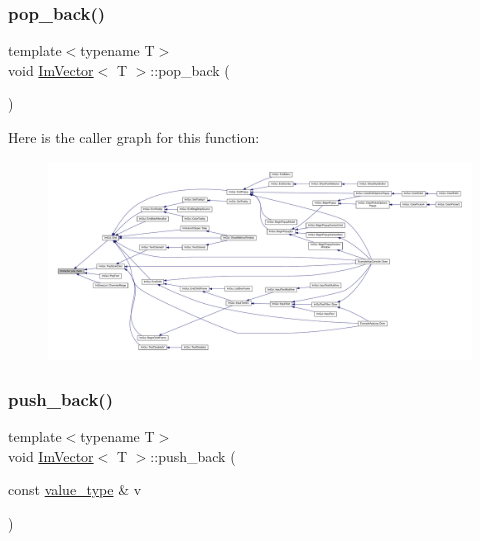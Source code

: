 \mbox{\label{class_im_vector_a3db7ce62d3c429effdb893fbf7148c1c}} 
\subsubsection{\texorpdfstring{pop\+\_\+back()}{pop\_back()}}
{\footnotesize\ttfamily template$<$typename T$>$ \\
void \mbox{\hyperlink{class_im_vector}{Im\+Vector}}$<$ T $>$\+::pop\+\_\+back (\begin{DoxyParamCaption}{ }\end{DoxyParamCaption})\hspace{0.3cm}{\ttfamily [inline]}}

Here is the caller graph for this function\+:
\nopagebreak
\begin{figure}[H]
\begin{center}
\leavevmode
\includegraphics[width=350pt]{class_im_vector_a3db7ce62d3c429effdb893fbf7148c1c_icgraph}
\end{center}
\end{figure}
\mbox{\label{class_im_vector_a68387993f2a5f5c3b2a7139d9ab778b8}} 
\subsubsection{\texorpdfstring{push\+\_\+back()}{push\_back()}}
{\footnotesize\ttfamily template$<$typename T$>$ \\
void \mbox{\hyperlink{class_im_vector}{Im\+Vector}}$<$ T $>$\+::push\+\_\+back (\begin{DoxyParamCaption}\item[{const \mbox{\hyperlink{class_im_vector_a8bd77e4e7581d8e5f9e98d7c2f3c2a80}{value\+\_\+type}} \&}]{v }\end{DoxyParamCaption})\hspace{0.3cm}{\ttfamily [inline]}}

